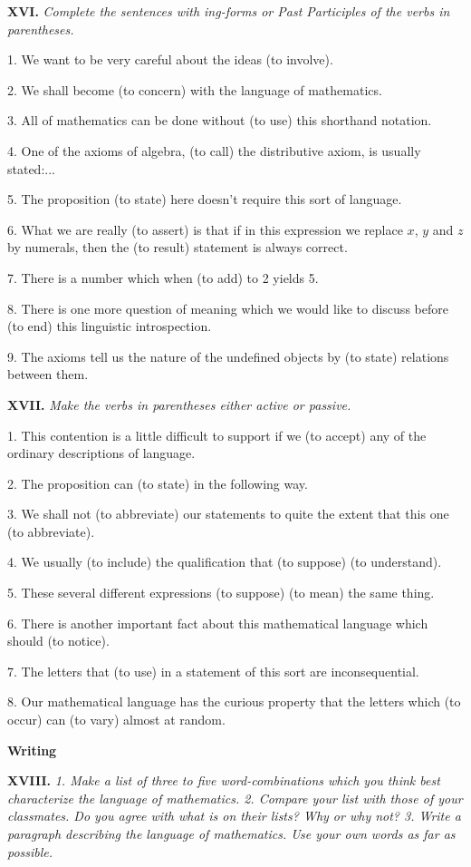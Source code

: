 \documentclass[a4paper]{article}
\newcommand{\ESect}[1]{\medskip\par{\large \textbf{#1}}\par}
\newcommand{\ETask}[2]{\medskip\par\textbf{#1.} \textit{#2}\par}
\begin{document}
\ETask{XVI}{Complete the sentences with ing-forms or Past Participles of the verbs in parentheses.}
1. We want to be very careful about the ideas (to involve).

2. We shall become (to concern) with the language of mathematics.

3. All of mathematics can be done without (to use) this shorthand notation.

4. One of the axioms of algebra, (to call) the distributive axiom, is usually stated:...

5. The proposition (to state) here doesn't require this sort of language.

6. What we are really (to assert) is that if in this expression we replace $x$, $y$ and $z$ by numerals, then the
(to result) statement is always correct.

7. There is a number which when (to add) to 2 yields 5.

8. There is one more question of meaning which we would like to discuss before (to end) this linguistic introspection.

9. The axioms tell us the nature of the undefined objects by (to state) relations between them.

\ETask{XVII}{Make the verbs in parentheses either active or passive.}

1. This contention is a little difficult to support if we (to accept) any of the ordinary descriptions of language.

2. The proposition can (to state) in the following way.

3. We shall not (to abbreviate) our statements to quite the extent that this one (to abbreviate).

4. We usually (to include) the qualification that (to suppose) (to understand).

5. These several different expressions (to suppose) (to mean) the same thing.

6. There is another important fact about this mathematical language which should (to notice).

7. The letters that (to use) in a statement of this sort are inconsequential.

8. Our mathematical language has the curious property that the letters which (to occur) can (to vary) almost at random.

\ESect{Writing}
\ETask{XVIII}{1. Make a list of three to five word-combinations which you think best characterize the language of mathematics.
2. Compare your list with those of your classmates. Do you agree with what is on their lists? Why or why not? 3. Write a
paragraph describing the language of mathematics. Use your own words as far as possible.}
\end{document}
